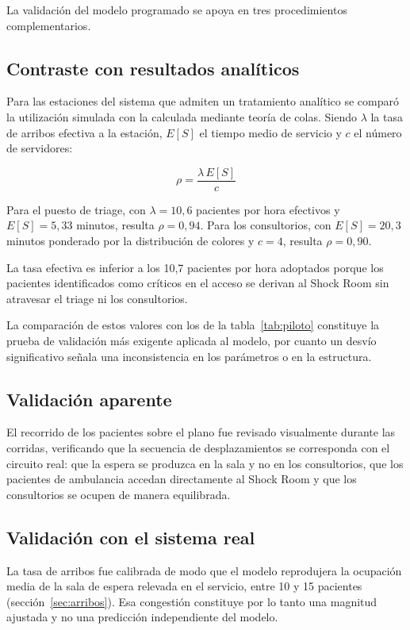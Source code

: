 \documentclass{article}
\begin{document}
La validación del modelo programado se apoya en tres procedimientos
complementarios.

\subsection{Contraste con resultados analíticos}

Para las estaciones del sistema que admiten un tratamiento analítico se
comparó la utilización simulada con la calculada mediante teoría de colas.
Siendo $\lambda$ la tasa de arribos efectiva a la estación, $E[S]$ el tiempo
medio de servicio y $c$ el número de servidores:

\[
\rho = \frac{\lambda\, E[S]}{c}
\]

Para el puesto de triage, con $\lambda = 10{,}6$ pacientes por hora
efectivos y $E[S] = 5{,}33$ minutos, resulta $\rho = 0{,}94$. Para los
consultorios, con $E[S] = 20{,}3$ minutos ponderado por la distribución de
colores y $c = 4$, resulta $\rho = 0{,}90$.

La tasa efectiva es inferior a los 10,7 pacientes por hora adoptados porque
los pacientes identificados como críticos en el acceso se derivan al Shock
Room sin atravesar el triage ni los consultorios.

La comparación de estos valores con los de la tabla~\ref{tab:piloto}
constituye la prueba de validación más exigente aplicada al modelo, por
cuanto un desvío significativo señala una inconsistencia en los parámetros o
en la estructura.

\subsection{Validación aparente}

El recorrido de los pacientes sobre el plano fue revisado visualmente durante
las corridas, verificando que la secuencia de desplazamientos se corresponda
con el circuito real: que la espera se produzca en la sala y no en los
consultorios, que los pacientes de ambulancia accedan directamente al Shock
Room y que los consultorios se ocupen de manera equilibrada.

\subsection{Validación con el sistema real}

La tasa de arribos fue calibrada de modo que el modelo reprodujera la
ocupación media de la sala de espera relevada en el servicio, entre 10 y 15
pacientes (sección~\ref{sec:arribos}). Esa congestión constituye por lo tanto
una magnitud ajustada y no una predicción independiente del modelo.
\end{document}
